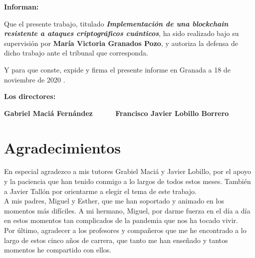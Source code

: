 \vspace{0.5cm}

\textbf{Informan:}

\vspace{0.5cm}

Que el presente trabajo, titulado \textit{\textbf{ Implementación de una blockchain resistente a ataques criptográficos cuánticos}},
ha sido realizado bajo su supervisión por \textbf{María Victoria Granados Pozo}, y autoriza la defensa de dicho trabajo ante el tribunal
que corresponda.

\vspace{0.5cm}

Y para que conste, expide y firma el presente informe en Granada a 18 de noviembre de 2020 .

\vspace{1cm}

\textbf{Los directores:}

\vspace{5cm}

\noindent \textbf{Gabriel Maciá Fernández \ \ \ \ \ Francisco Javier Lobillo Borrero}

\chapter*{Agradecimientos}
\thispagestyle{empty}

       \vspace{1cm}


En especial agradezco a mis tutores Grabiel Maciá y Javier Lobillo, por el apoyo y la paciencia que han tenido conmigo a lo largos de todos estos meses. También a Javier Tallón por orientarme a elegir el tema de este trabajo.\\

A mis padres, Miguel y Esther, que me han soportado y animado en los momentos más difíciles. A mi hermano, Miguel, por darme fuerza en el día a día en estos momentos tan complicados de la pandemia que nos ha tocado vivir.\\

Por último, agradecer a los profesores y compañeros que me he encontrado a lo largo de estos cinco años de carrera, que tanto me han enseñado y tantos momentos he compartido con ellos.\\







